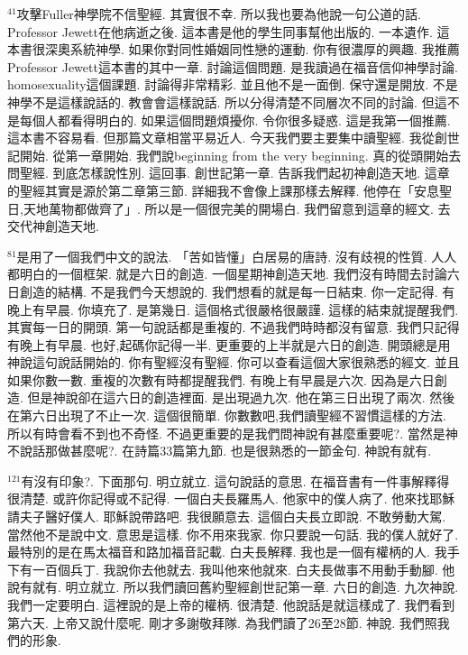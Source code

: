 \documentclass{book}
\begin{document}
$^{41}$攻擊Fuller神學院不信聖經.
其實很不幸.
所以我也要為他說一句公道的話.
Professor Jewett在他病逝之後.
這本書是他的學生同事幫他出版的.
一本遺作.
這本書很深奧系統神學.
如果你對同性婚姻同性戀的運動.
你有很濃厚的興趣.
我推薦Professor Jewett這本書的其中一章.
討論這個問題.
是我讀過在福音信仰神學討論.
homosexuality這個課題.
討論得非常精彩.
並且他不是一面倒.
保守還是開放.
不是神學不是這樣說話的.
教會會這樣說話.
所以分得清楚不同層次不同的討論.
但這不是每個人都看得明白的.
如果這個問題煩擾你.
令你很多疑惑.
這是我第一個推薦.
這本書不容易看.
但那篇文章相當平易近人.
今天我們要主要集中讀聖經.
我從創世記開始.
從第一章開始.
我們說beginning from the very beginning.
真的從頭開始去問聖經.
到底怎樣說性別.
這回事.
創世記第一章.
告訴我們起初神創造天地.
這章的聖經其實是源於第二章第三節.
詳細我不會像上課那樣去解釋.
他停在「安息聖日,天地萬物都做齊了」.
所以是一個很完美的開場白.
我們留意到這章的經文.
去交代神創造天地.

$^{81}$是用了一個我們中文的說法.
「苦如皆懂」白居易的唐詩.
沒有歧視的性質.
人人都明白的一個框架.
就是六日的創造.
一個星期神創造天地.
我們沒有時間去討論六日創造的結構.
不是我們今天想說的.
我們想看的就是每一日結束.
你一定記得.
有晚上有早晨.
你填充了.
是第幾日.
這個格式很嚴格很嚴謹.
這樣的結束就提醒我們.
其實每一日的開頭.
第一句說話都是重複的.
不過我們時時都沒有留意.
我們只記得有晚上有早晨.
也好,起碼你記得一半.
更重要的上半就是六日的創造.
開頭總是用神說這句說話開始的.
你有聖經沒有聖經.
你可以查看這個大家很熟悉的經文.
並且如果你數一數.
重複的次數有時都提醒我們.
有晚上有早晨是六次.
因為是六日創造.
但是神說卻在這六日的創造裡面.
是出現過九次.
他在第三日出現了兩次.
然後在第六日出現了不止一次.
這個很簡單.
你數數吧,我們讀聖經不習慣這樣的方法.
所以有時會看不到也不奇怪.
不過更重要的是我們問神說有甚麼重要呢?.
當然是神不說話那做甚麼呢?.
在詩篇33篇第九節.
也是很熟悉的一節金句.
神說有就有.

$^{121}$有沒有印象?.
下面那句.
明立就立.
這句說話的意思.
在福音書有一件事解釋得很清楚.
或許你記得或不記得.
一個白夫長羅馬人.
他家中的僕人病了.
他來找耶穌請夫子醫好僕人.
耶穌說帶路吧.
我很願意去.
這個白夫長立即說.
不敢勞動大駕.
當然他不是說中文.
意思是這樣.
你不用來我家.
你只要說一句話.
我的僕人就好了.
最特別的是在馬太福音和路加福音記載.
白夫長解釋.
我也是一個有權柄的人.
我手下有一百個兵丁.
我說你去他就去.
我叫他來他就來.
白夫長做事不用動手動腳.
他說有就有.
明立就立.
所以我們讀回舊約聖經創世記第一章.
六日的創造.
九次神說.
我們一定要明白.
這裡說的是上帝的權柄.
很清楚.
他說話是就這樣成了.
我們看到第六天.
上帝又說什麼呢.
剛才多謝敬拜隊.
為我們讀了26至28節.
神說.
我們照我們的形象.
\end{document}

